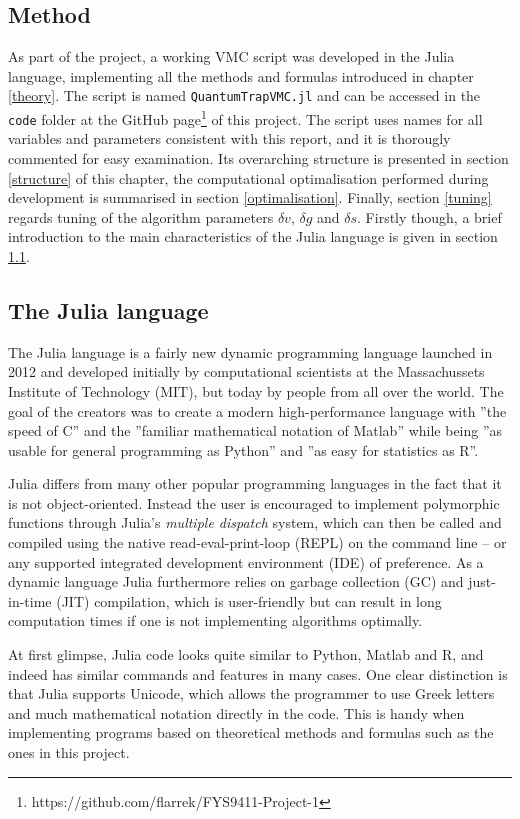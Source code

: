 \documentclass[a4paper,8pt]{article}
\begin{document}
\begin{multicols}{2}
\section{Method}\label{method}
As part of the project, a working VMC script was developed in the Julia language, implementing all the methods and formulas introduced in chapter \ref{theory}. The script is named \texttt{QuantumTrapVMC.jl} and can be accessed in the \texttt{code} folder at the GitHub page\footnote{https://github.com/flarrek/FYS9411-Project-1} of this project. The script uses names for all variables and parameters consistent with this report, and it is thorougly commented for easy examination. Its overarching structure is presented in section \ref{structure} of this chapter, the computational optimalisation performed during development is summarised in section \ref{optimalisation}. Finally, section \ref{tuning} regards tuning of the algorithm parameters $\delta v$, $\delta g$ and $\delta s$. Firstly though, a brief introduction to the main characteristics of the Julia language is given in section \ref{Julia}.


\subsection{The Julia language}\label{Julia}
The Julia language is a fairly new dynamic programming language launched in 2012 and developed initially by computational scientists at the Massachussets Institute of Technology (MIT), but today by people from all over the world. The goal of the creators was to create a modern high-performance language with ''the speed of C'' and the ''familiar mathematical notation of Matlab'' while being ''as usable for general programming as Python'' and ''as easy for statistics as R''.\cite{JuliaGoal}

Julia differs from many other popular programming languages in the fact that it is not object-oriented. Instead the user is encouraged to implement polymorphic functions through Julia's \textit{multiple dispatch} system, which can then be called and compiled using the native read-eval-print-loop (REPL) on the command line -- or any supported integrated development environment (IDE) of preference. As a dynamic language Julia furthermore relies on garbage collection (GC) and just-in-time (JIT) compilation, which is user-friendly but can result in long computation times if one is not implementing algorithms optimally.

At first glimpse, Julia code looks quite similar to Python, Matlab and R, and indeed has similar commands and features in many cases. One clear distinction is that Julia supports Unicode, which allows the programmer to use Greek letters and much mathematical notation directly in the code. This is handy when implementing programs based on theoretical methods and formulas such as the ones in this project.



\end{multicols}
\end{document}
